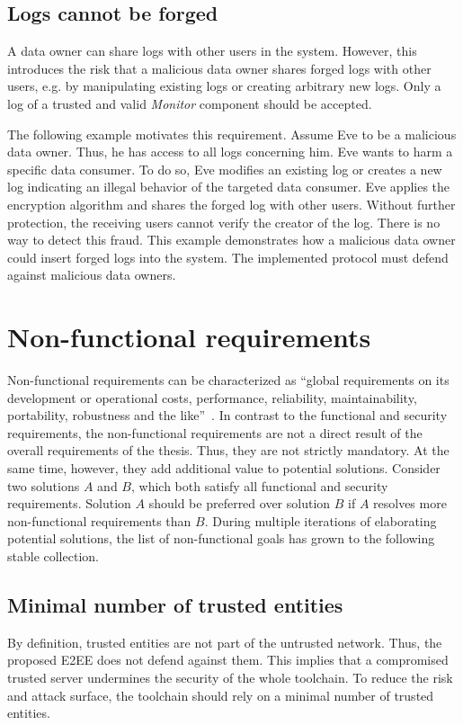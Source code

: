 \documentclass[../main.tex]{subfiles}
\begin{document}
\subsection{Logs cannot be forged}

A data owner can share logs with other users in the system.
However, this introduces the risk that a malicious data owner shares forged logs with other users, e.g. by manipulating existing logs or creating arbitrary new logs.
Only a log of a trusted and valid \emph{Monitor} component should be accepted.

The following example motivates this requirement.
Assume Eve to be a malicious data owner.
Thus, he has access to all logs concerning him.
Eve wants to harm a specific data consumer.
To do so, Eve modifies an existing log or creates a new log indicating an illegal behavior of the targeted data consumer.
Eve applies the encryption algorithm and shares the forged log with other users.
Without further protection, the receiving users cannot verify the creator of the log.
There is no way to detect this fraud.
This example demonstrates how a malicious data owner could insert forged logs into the system.
The implemented protocol must defend against malicious data owners.

\section{Non-functional requirements}\label{non-functional-requriements}
Non-functional requirements can be characterized as \enquote{global requirements on its development or operational costs, performance, reliability, maintainability, portability, robustness and the like}~\cite[11]{Mylopoulos1992}.
In contrast to the functional and security requirements, the non-functional requirements are not a direct result of the overall requirements of the thesis.
Thus, they are not strictly mandatory.
At the same time, however, they add additional value to potential solutions.
Consider two solutions $A$ and $B$, which both satisfy all functional and security requirements.
Solution $A$ should be preferred over solution $B$ if $A$ resolves more non-functional requirements than $B$.
During multiple iterations of elaborating potential solutions, the list of non-functional goals has grown to the following stable collection.

\subsection{Minimal number of trusted entities}
By definition, trusted entities are not part of the untrusted network. 
Thus, the proposed E2EE does not defend against them.
This implies that a compromised trusted server undermines the security of the whole toolchain.
To reduce the risk and attack surface, the toolchain should rely on a minimal number of trusted entities.
\end{document}
